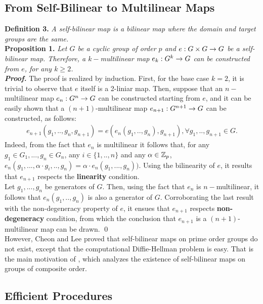 \subsection{From Self-Bilinear to Multilinear Maps}

\textbf{Definition 3.} \textit{A self-bilinear map is a bilinear map where the domain and target groups are the same.} \\

\textbf{Proposition 1.} \textit{Let $G$ be a cyclic group of order $p$ and $e:G\times G\rightarrow G$ be a self-bilinear map. Therefore, a $k-$multilinear map $e_k:G^k \rightarrow G$ can be constructed from $e$, for any $k \geq 2$.}\\

\textbf{\textit{Proof.}} The proof is realized by induction. First, for the base case $k = 2$, it is trivial to observe that $e$ itself is a 2-liniar map. Then, suppose that an $n-$multilinear map $e_n:G^n\rightarrow G$ can be constructed starting from $e$, and it can be easily shown that a $(n+1)$-multilinear map $e_{n+1}:G^{n+1}\rightarrow G$ can be constructed, as follows:
\begin{align*}
	e_{n+1}(g_1,..,g_n, g_{n+1}) = e(e_n(g_1,.., g_n), g_{n+1}), \forall g_1, .., g_{n+1} \in G.
\end{align*}
Indeed, from the fact that $e_n$ is multilinear it follows that, for any $g_1\in G_1, ..., g_n \in G_n$, any $i\in \{1,..,n\}$ and any $\alpha \in {\mathbb Z}_p$,  $e_n(g_1,...,\alpha \cdot g_i, ..,g_n) = \alpha \cdot e_n(g_1,...,g_n))$. Using the bilinearity of $e$, it results that $e_{n+1}$ respects the \textbf{linearity} condition.\\
Let $g_1, ...,g_n$ be generators of $G$. Then, using the fact that $e_{n}$ is $n-$multilinear, it follows that $e_n(g_1,..,g_n)$ is also a generator of $G$. Corroborating the last result with the non-degeneracy property of $e$, it ensues that $e_{n+1}$ respects \textbf{non-degeneracy} condition, from which the conclusion that $e_{n+1}$ is a $(n+1)$-multilinear map can be drawn. \qed\\

However, Cheon and Lee \cite{ChL09} proved that self-bilinear maps on prime order groups do not exist, except that the computational Diffie-Hellman problem is easy. That is the main motivation of \cite{BCM16}, which analyzes the existence of self-bilinear maps on groups of composite order.

\subsection{Efficient Procedures}

